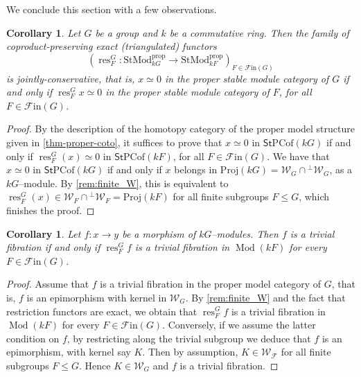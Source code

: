 \documentclass{amsart}
\newcommand{\res}{\operatorname{res}\nolimits}
\def \F{{\mathcal F}}
\def \W{{\mathcal W}}
\def \Fin{{\mathcal{F}\textrm{in}}}
\def \Wfin{{\mathcal W}_{G}}
\DeclareMathOperator{\Mod}{Mod}
\numberwithin{equation}{section}%
\newtheorem{corollary}[equation]{Corollary}
\theoremstyle{remark}
\begin{document}
{We conclude this section with a few observations. 


\begin{corollary}\label{coro-detection}
 Let $G$ be a group and $k$ be a commutative ring. Then the family of coproduct-preserving exact (triangulated) functors 
 \[
 (\res^G_F \colon \mathrm{StMod}^{\mathrm{prop}}_{kG}\to \mathrm{StMod}^{\mathrm{prop}}_{kF})_{F\in \Fin(G)}
 \]
 is jointly-conservative, that is, $x\simeq 0$ in the proper stable {module} category of $G$ if and only if $\res^G_Fx\simeq 0$ in the proper stable {module} category of $F$, for all $F\in \Fin(G)$. 
\end{corollary}

\begin{proof}
By the description of the homotopy category of the proper model structure given in \cref{thm-proper-coto}, it suffices to prove that $x\simeq 0$ in $\mathsf{St}\mathrm{PCof}(kG)$ if and only if $\res^G_F(x)\simeq 0$ in  $\mathsf{St}\mathrm{PCof}(kF)$, for all $F\in \Fin(G)$. We have that $x\simeq 0$ in $\mathsf{St}\mathrm{PCof}(kG)$ if and only if $x$ belongs in $\mathrm{Proj}(kG)=\mathcal{W}_{G}\cap {}^\perp\mathcal{W}_{G}$, as a $kG$--module. By \cref{rem:finite_W}, this is equivalent to $\res^G_F(x)\in\mathcal{W}_{F}\cap {}^\perp\mathcal{W}_{F}=\mathrm{Proj}(kF)$ for all finite subgroups $F\leqslant  G$, which finishes the proof.
\end{proof}

\begin{corollary}
    \label{lemma-weak-equivalences}
    Let $f\colon x\to y$ be a morphism of $kG$--modules. Then $f$ is a trivial fibration if and only if $\res^G_Ff$ is a trivial fibration in $\Mod(kF)$ for every $F\in \Fin(G)$. 
\end{corollary}

\begin{proof}
  Assume that $f$ is a trivial fibration in the proper model category of $G$, that is, $f$ is an epimorphism with kernel in $\Wfin$. By  \cref{rem:finite_W} and the fact that restriction functors are exact, we obtain that $\res^G_Ff$ is a trivial fibration in $\Mod(kF)$ for every $F\in \Fin(G)$. Conversely, if we assume the latter condition on $f$, by restricting along the trivial subgroup we deduce that $f$ is an epimorphism, with kernel say $K$. Then by assumption, $K\in\W_{\F}$ for all finite subgroups $F\leqslant  G$. Hence $K\in\Wfin$ and $f$ is a trivial fibration.
\end{proof}

}
\end{document}
